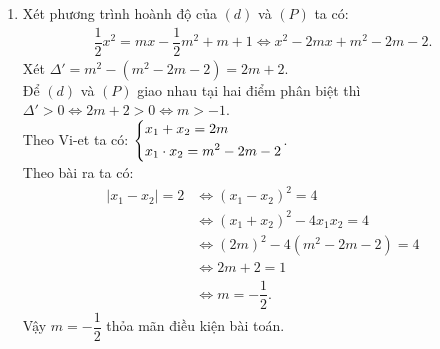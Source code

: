 \begin{ex}
{\begin{enumerate}[1)]
\begin{enumerate}
	\item Xét phương trình hoành độ của $(d)$ và $(P)$ ta có:
	\begin{align*}
	\dfrac{1}{2}x^2 = mx - \dfrac{1}{2}m^2 + m + 1 \Leftrightarrow x^2 - 2mx + m^2 - 2m - 2.
	\end{align*}
	Xét $\Delta ' = m^2 - (m^2 - 2m - 2) = 2m + 2$.\\
	 Để $(d)$ và $(P)$ giao nhau tại hai điểm phân biệt thì $\Delta ' > 0 \Leftrightarrow 2m + 2 > 0 \Leftrightarrow m > -1$.\\
	Theo Vi-et ta có: $\left\{\begin{aligned}&x_1 + x_2 = 2m\\ &x_1\cdot x_2 = m^2 - 2m - 2\end{aligned}\right.$.\\
	Theo bài ra ta có: 
	\begin{align*}
	|x_1 - x_2| = 2 &\Leftrightarrow (x_1 - x_2)^2 = 4\\
	&\Leftrightarrow (x_1 + x_2)^2 - 4x_1x_2 = 4\\
	&\Leftrightarrow (2m)^2 - 4(m^2 - 2m - 2) = 4\\
	&\Leftrightarrow 2m + 2 = 1\\
	&\Leftrightarrow m = -\dfrac{1}{2}.
	\end{align*}
	Vậy $m = -\dfrac{1}{2}$ thỏa mãn điều kiện bài toán.
	\end{enumerate}
\end{enumerate}	
}
\end{ex}  

